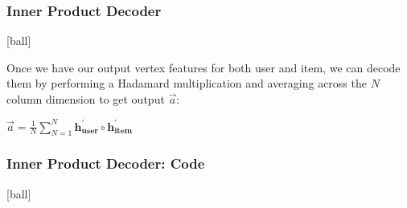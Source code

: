 \documentclass{beamer}
\begin{document}

\begin{frame}[fragile]
\begin{itemize}
\frametitle{Inner Product Decoder}
[ball]

\item Once we have our output vertex features for both user and item, we can decode them by performing a Hadamard multiplication and averaging across the
$N$ column dimension to get output $\overrightarrow{a}$:

\vspace{0.5cm}

\begin{center}
    \item[] $\overrightarrow{a} = \frac{1}{N} \sum_{N=1}^{N} \mathbf{h^{'}_{\text{user}}} \circ \mathbf{h^{'}_{\text{item}}}$
\end{center}

\end{itemize}
\end{frame}


\begin{frame}[fragile]
\frametitle{Inner Product Decoder: Code}
[ball]



\end{frame}

\end{document}
